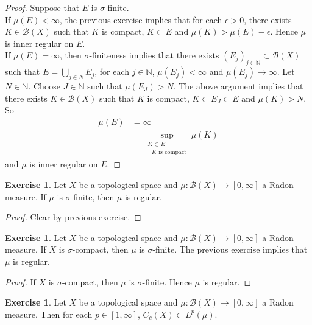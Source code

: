 \documentclass{book}
\theoremstyle{definition}
\newtheorem{ex}[definition]{Exercise}
\newcommand{\ep}{\epsilon}
\newcommand{\sig}{\sigma}
\newcommand{\N}{\mathbb{N}}
\newcommand{\MB}{\mathcal{B}}
\newcommand{\lex}[1]{\label{ex:#1}}
\DeclareMathOperator*{\0}{\mbf{0}}
\DeclareMathOperator*{\1}{\mbf{1}}
\newcommand{\RG}{[0,\infty]}
\begin{document}
	\begin{proof}
	Suppose that $E$ is $\sig$-finite. \\
	If $\mu(E) < \infty$, the previous exercise implies that for each $\ep > 0 $, there exists $K \in \MB(X)$ such that $K$ is compact, $K \subset E$ and $\mu(K) > \mu(E) - \ep$. Hence $\mu$ is inner regular on $E$. \\
	If $\mu(E) = \infty$, then $\sig$-finiteness implies that there exists $(E_j)_{j \in \N} \subset \MB(X)$ such that $E = \bigcup\limits_{j \in N} E_j$, for each $j \in \N$, $\mu(E_j) < \infty$ and $\mu(E_j) \rightarrow \infty$. Let $N \in \N$. Choose $J \in \N$ such that $\mu(E_J) > N$. The above argument implies that there exists $K \in \MB(X)$ such that $K$ is compact, $K \subset E_J \subset E$ and $\mu(K) > N$. So 
	\begin{align*}
	\mu(E)
	&= \infty \\
	&= \sup_{\substack{ K \subset E \\ \text{ $K$ is compact}}} \mu(K)
	\end{align*}	 
and $\mu$ is inner regular on $E$.  
	\end{proof}		
	
	\begin{ex} \lex{00000} 
	Let $X$ be a topological space and $\mu: \MB(X) \rightarrow \RG$ a Radon measure. If $\mu$ is $\sig$-finite, then $\mu$ is regular.
	\end{ex}
	
	\begin{proof}
	Clear by previous exercise.
	\end{proof}
	
	\begin{ex} \lex{00000} 
	Let $X$ be a topological space and $\mu: \MB(X) \rightarrow \RG$ a Radon measure. If $X$ is $\sig$-compact, then $\mu$ is $\sig$-finite. The previous exercise implies that $\mu$ is regular. 
	\end{ex}
	
	\begin{proof}
	If $X$ is $\sig$-compact, then $\mu$ is $\sig$-finite. Hence $\mu$ is regular.
	\end{proof}
	
		
	
	\begin{ex} \lex{00000} 
	Let $X$ be a topological space and $\mu:\MB(X) \rightarrow \RG$ a Radon measure. Then for each $p \in [1, \infty]$, $C_c(X) \subset L^p(\mu)$.
	\end{ex}
	
\end{document}
